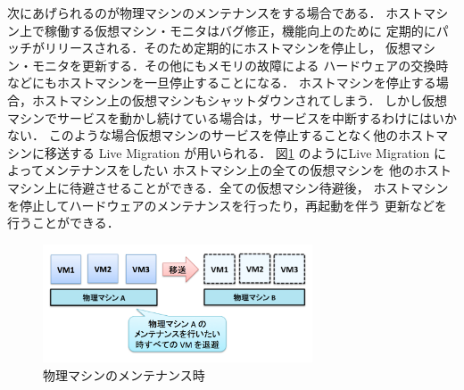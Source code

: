 \documentclass[graduation-thesis]{mlarticle}
\begin{document}
次にあげられるのが物理マシンのメンテナンスをする場合である．
ホストマシン上で稼働する仮想マシン・モニタはバグ修正，機能向上のために
定期的にパッチがリリースされる．そのため定期的にホストマシンを停止し，
仮想マシン・モニタを更新する．その他にもメモリの故障による
ハードウェアの交換時などにもホストマシンを一旦停止することになる．
ホストマシンを停止する場合，ホストマシン上の仮想マシンもシャットダウンされてしまう．
しかし仮想マシンでサービスを動かし続けている場合は，サービスを中断するわけにはいかない．
このような場合仮想マシンのサービスを停止することなく他のホストマシンに移送する
Live Migration が用いられる．
図\ref{maintenance} のようにLive Migration によってメンテナンスをしたい
ホストマシン上の全ての仮想マシンを
他のホストマシン上に待避させることができる．全ての仮想マシン待避後，
ホストマシンを停止してハードウェアのメンテナンスを行ったり，再起動を伴う
更新などを行うことができる．
\begin{figure}[H]\begin{center}\includegraphics[width=8.0cm]{./img/maintenance.png}\caption{ 物理マシンのメンテナンス時 }\label{maintenance}\end{center}\end{figure}
\end{document}
